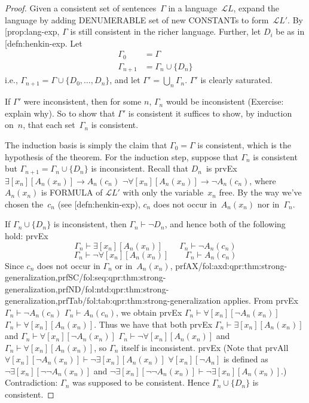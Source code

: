 \documentclass[10pt,a4paper]{article}
\makeatletter
\newcommand*{\olup}[1]{\MakeUppercase{#1}}
\theoremstyle{plain}
\theoremstyle{definition}
\theoremstyle{remark}
\newcommand{\olref}{\@ifnextchar[{\olref@i}{\olref@final}}
\def\olref@i[#1]{\@ifnextchar[{\olref@ii}{\olref@final}}
\def\olref@ii[#1]{\@ifnextchar[{\olref@iii}{\olref@final}}
\def\olref@iii[#1]{\olref@final}
\def\olref@final#1{\ref{#1}}
\providecommand{\lif}{\mathbin{\rightarrow}}
\providecommand{\lforall}{\mathord{\forall}}
\providecommand{\lexists}{\mathord{\exists}}
\providecommand{\Proves}{\mathrel{\vdash}}
\providecommand{\Lang}{\ensuremath{\mathcal{L}}}
\providecommand{\iftag}[1]{#1}
\providecommand{\tagrefs}[1]{#1}
\providecommand{\iftag}{}
\providecommand{\tagrefs}[1]{}
\makeatother
\begin{document}
\begin{proof}
Given a consistent set of sentences~$\Gamma$ in a language~$\Lang{L}$,
expand the language by adding \olup{denumerable} set of new
\olup{constant}s to form~$\Lang{L'}$.  By \olref{prop:lang-exp}, $\Gamma$
is still consistent in the richer language.  Further, let $D_i$ be as
in \olref{defn:henkin-exp}.  Let
\begin{align*}
\Gamma_0 & = \Gamma \\
\Gamma_{n+1} & = \Gamma_n \cup \{D_n \}
\end{align*}
i.e., $\Gamma_{n+1} = \Gamma \cup \{ D_0, \dots, D_n \}$, and let
$\Gamma' = \bigcup_{n} \Gamma_n$.  $\Gamma'$ is clearly saturated.

If $\Gamma'$ were inconsistent, then for some $n$, $\Gamma_n$ would be
inconsistent (Exercise: explain why).  So to show that $\Gamma'$ is
consistent it suffices to show, by induction on~$n$, that each
set~$\Gamma_n$ is consistent.

The induction basis is simply the claim that $\Gamma_0 = \Gamma$ is
consistent, which is the hypothesis of the theorem.  For the induction
step, suppose that $\Gamma_{n}$ is consistent but $\Gamma_{n+1} =
\Gamma_n \cup \{D_n\}$ is inconsistent.  Recall that $D_n$~is
\iftag{prvEx}
{$\lexists[x_{n}][A_{n}(x_n)] \lif A_{n}(c_{n})$}
{$\lnot\lforall[x_{n}][A_{n}(x_n)] \lif \lnot A_{n}(c_{n})$},
where $A_n(x_n)$ is \olup{formula} of $\Lang{L'}$ with only the
variable~$x_n$ free. By the way we've chosen the~$c_n$ (see
\olref{defn:henkin-exp}), $c_n$ does not occur in~$A_n(x_n)$ nor
in~$\Gamma_n$.

If $\Gamma_n \cup \{D_n\}$ is inconsistent, then $\Gamma_n
\Proves \lnot D_n$, and hence both of the following hold:
\iftag{prvEx}{
\[
\Gamma_n \Proves \lexists[x_n][A_n(x_n)]
\qquad
\Gamma_n \Proves \lnot A_n(c_n)
\]}{
\[
\Gamma_n \Proves \lnot\lforall[x_n][A_n(x_n)]
\qquad
\Gamma_n \Proves A_n(c_n)
\]}
Since $c_n$ does not occur in
$\Gamma_n$ or in~$A_n(x_n)$, 
\tagrefs{prfAX/{fol:axd:qpr:thm:strong-generalization},prfSC/{fol:seq:qpr:thm:strong-generalization},prfND/{fol:ntd:qpr:thm:strong-generalization},prfTab/{fol:tab:qpr:thm:strong-generalization}} applies.
From \iftag{prvEx}
{$\Gamma_n \Proves \lnot A_n(c_n)$}
{$\Gamma_n \Proves A_n(c_n)$},
we obtain
\iftag{prvEx}
{$\Gamma_n \Proves \lforall[x_n][\lnot A_n(x_n)]$}
{$\Gamma_n \Proves \lforall[x_n][A_n(x_n)]$}.
Thus we have that both
\iftag{prvEx}
{$\Gamma_n \Proves \lexists[x_n][A_n(x_n)]$ and
$\Gamma_n \Proves \lforall[x_n][\lnot A_n(x_n)]$}
{$\Gamma_n \Proves \lnot\lforall[x_n][A_n(x_n)]$ and
$\Gamma_n \Proves \lforall[x_n][A_n(x_n)]$},
so $\Gamma_n$ itself is inconsistent.
\iftag{prvEx}
{(Note that
\iftag{prvAll}
{$\lforall[x_n][\lnot A_n(x_n)] \Proves
  \lnot\lexists[x_n][A_n(x_n)]$}
{$\lforall[x_n][\lnot A_n]$ is defined as
  $\lnot\lexists[x_n][\lnot\lnot A_n(x_n)]$ and
  $\lnot\lexists[x_n][\lnot\lnot A_n(x_n)] \Proves
  \lnot\lexists[x_n][A_n(x_n)]$}.)}{}
Contradiction: $\Gamma_n$ was supposed to be consistent.  Hence
$\Gamma_n \cup \{ D_n\}$ is consistent.
\end{proof}
\end{document}
